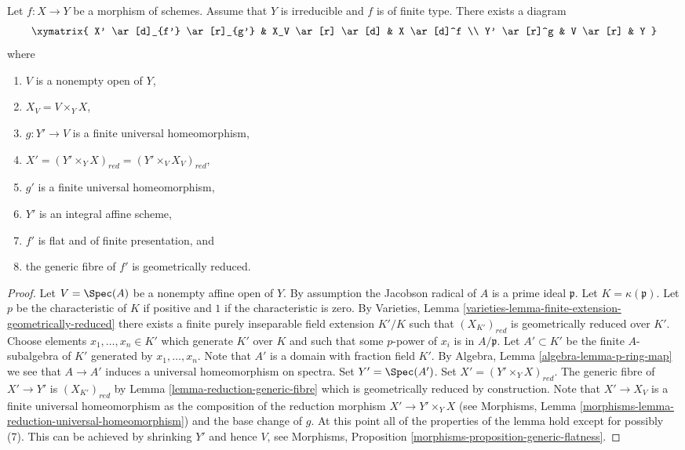 \begin{lemma}
\label{lemma-make-generic-fibre-geometrically-reduced}
Let $f : X \to Y$ be a morphism of schemes.
Assume that $Y$ is irreducible and $f$ is of finite type.
There exists a diagram
$$
\xymatrix{
X' \ar[d]_{f'} \ar[r]_{g'} & X_V \ar[r] \ar[d] & X \ar[d]^f \\
Y' \ar[r]^g & V \ar[r] & Y
}
$$
where
\begin{enumerate}
\item $V$ is a nonempty open of $Y$,
\item $X_V = V \times_Y X$,
\item $g : Y' \to V$ is a finite universal homeomorphism,
\item $X' = (Y' \times_Y X)_{red} = (Y' \times_V X_V)_{red}$,
\item $g'$ is a finite universal homeomorphism,
\item $Y'$ is an integral affine scheme,
\item $f'$ is flat and of finite presentation, and
\item the generic fibre of $f'$ is geometrically reduced.
\end{enumerate}
\end{lemma}

\begin{proof}
Let $V = \Spec(A)$ be a nonempty affine open of $Y$.
By assumption the Jacobson radical of $A$ is a prime ideal $\mathfrak p$.
Let $K = \kappa(\mathfrak p)$.
Let $p$ be the characteristic of $K$ if positive and $1$
if the characteristic is zero. By
Varieties, Lemma \ref{varieties-lemma-finite-extension-geometrically-reduced}
there exists a finite purely inseparable field extension
$K'/K$ such that $(X_{K'})_{red}$ is geometrically reduced over $K'$.
Choose elements $x_1, \ldots, x_n \in K'$ which generate $K'$ over
$K$ and such that some $p$-power of $x_i$ is in $A/\mathfrak p$.
Let $A' \subset K'$ be the finite $A$-subalgebra of $K'$ generated by
$x_1, \ldots, x_n$. Note that $A'$ is a domain with fraction field $K'$. By
Algebra, Lemma \ref{algebra-lemma-p-ring-map}
we see that $A \to A'$ induces a universal homeomorphism on spectra.
Set $Y' = \Spec(A')$. Set $X' = (Y' \times_Y X)_{red}$.
The generic fibre of $X' \to Y'$ is $(X_{K'})_{red}$ by
Lemma \ref{lemma-reduction-generic-fibre}
which is geometrically reduced by construction.
Note that $X' \to X_V$ is a finite universal homeomorphism as the
composition of the reduction morphism $X' \to Y' \times_Y X$ (see
Morphisms, Lemma \ref{morphisms-lemma-reduction-universal-homeomorphism})
and the base change of $g$.
At this point all of the properties of the lemma hold except for
possibly (7). This can be achieved by shrinking $Y'$ and hence $V$, see
Morphisms, Proposition \ref{morphisms-proposition-generic-flatness}.
\end{proof}

